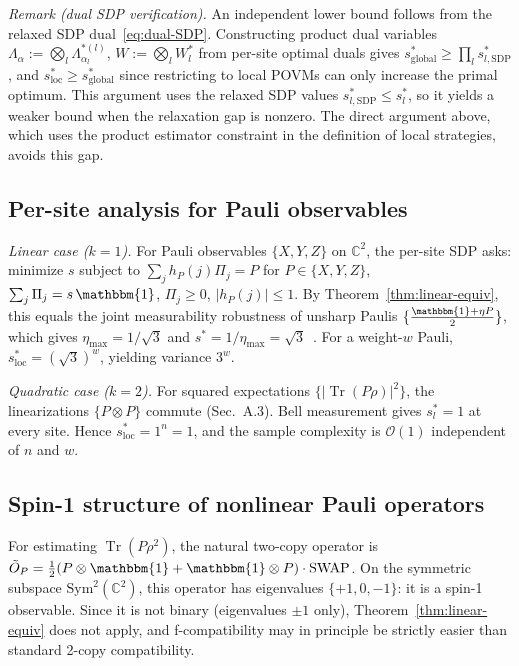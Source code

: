 \documentclass[aps,%
twocolumn,%
floatfix,%
pra,%
amsfonts,%
groupedaddress,%
superscriptaddress]{revtex4-2}%
\DeclareMathOperator{\tr}{Tr}
\newcommand{\ox}{\otimes}
\newcommand{\1}{\mathbbm{1}}
\begin{document}
\color{red}
\emph{Remark (dual SDP verification).} An independent lower bound follows from the relaxed SDP dual~\eqref{eq:dual-SDP}. Constructing product dual variables $\Lambda_\alpha := \bigotimes_{l} \Lambda_{\alpha_l}^{*(l)}$, $W := \bigotimes_{l} W_l^*$ from per-site optimal duals gives $s^*_{\mathrm{global}} \geq \prod_l s^*_{l,\mathrm{SDP}}$, and $s^*_{\mathrm{loc}} \geq s^*_{\mathrm{global}}$ since restricting to local POVMs can only increase the primal optimum. This argument uses the relaxed SDP values $s^*_{l,\mathrm{SDP}} \leq s^*_l$, so it yields a weaker bound when the relaxation gap is nonzero. The direct argument above, which uses the product estimator constraint in the definition of local strategies, avoids this gap.
\color{black}

\subsection{Per-site analysis for Pauli observables}

\emph{Linear case ($k=1$).} For Pauli observables $\{X,Y,Z\}$ on $\mathbb{C}^2$, the per-site SDP asks: minimize $s$ subject to $\sum_j h_P(j)\Pi_j = P$ for $P \in \{X,Y,Z\}$, $\sum_j \Pi_j = s\,\1$, $\Pi_j \geq 0$, $|h_P(j)| \leq 1$. By Theorem~\ref{thm:linear-equiv}, this equals the joint measurability robustness of unsharp Paulis $\{\frac{\1+\eta P}{2}\}$, which gives $\eta_{\max} = 1/\sqrt{3}$ and $s^* = 1/\eta_{\max} = \sqrt{3}$~\cite{Busch1986,heinosaari2015noise}. For a weight-$w$ Pauli, $s^*_{\mathrm{loc}} = (\sqrt{3})^w$, yielding variance $3^w$.

\emph{Quadratic case ($k=2$).} For squared expectations $\{|{\tr(P\rho)}|^2\}$, the linearizations $\{P\ox P\}$ commute (Sec.~A.3). Bell measurement gives $s^*_l = 1$ at every site. Hence $s^*_{\mathrm{loc}} = 1^n = 1$, and the sample complexity is $\mathcal{O}(1)$ independent of $n$ and $w$.

\subsection{Spin-1 structure of nonlinear Pauli operators}

For estimating $\tr(P\rho^2)$, the natural two-copy operator is $\tilde{O}_P = \frac{1}{2}(P\ox\1 + \1\ox P)\cdot\mathrm{SWAP}$. On the symmetric subspace $\mathrm{Sym}^2(\mathbb{C}^2)$, this operator has eigenvalues $\{+1, 0, -1\}$: it is a spin-1 observable. Since it is not binary (eigenvalues $\pm 1$ only), Theorem~\ref{thm:linear-equiv} does not apply, and f-compatibility may in principle be strictly easier than standard 2-copy compatibility.
\end{document}
